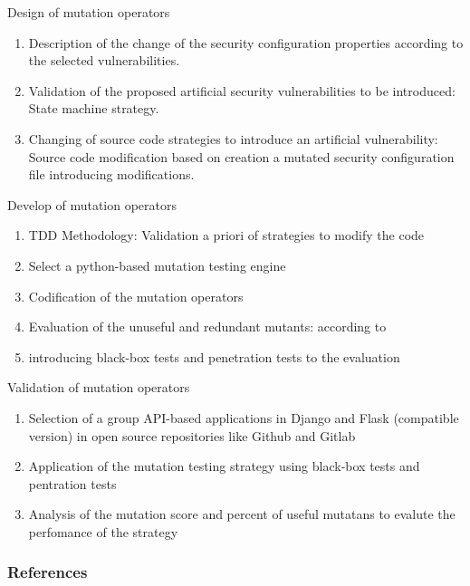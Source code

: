 \documentclass[10pt]{beamer}
\theoremstyle{remark}
\theoremstyle{definition}
\begin{document}
\begin{frame}[allowframebreaks]{Design of mutation operators}
  \begin{enumerate}
    \item Description of the change of the security configuration properties according to the selected vulnerabilities.
    \item Validation of the proposed artificial security vulnerabilities to be introduced: State machine strategy.
    \item Changing of source code strategies to introduce an artificial vulnerability: Source code modification based on creation a mutated security configuration file introducing modifications.
  \end{enumerate}
\end{frame}

\begin{frame}[allowframebreaks]{Develop of mutation operators}
  \begin{enumerate}
    \item TDD Methodology: Validation a priori of strategies to modify the code
    \item Select a python-based mutation testing engine
    \item Codification of the mutation operators
    \item Evaluation of the unuseful and redundant mutants: according to \cite{Papadakis2019}
    \item introducing black-box tests and penetration tests to the evaluation
  \end{enumerate}
\end{frame}

\begin{frame}[allowframebreaks]{Validation of mutation operators}
  \begin{enumerate}
    \item Selection of a group API-based applications in Django and Flask (compatible version) in open source repositories like Github and Gitlab
    \item Application of the mutation testing strategy using black-box tests and pentration tests
    \item Analysis of the mutation score and percent of useful mutatans to evalute the perfomance of the strategy
  \end{enumerate}
\end{frame}

\begin{frame}[allowframebreaks]
\frametitle{References}
  \printbibliography
\end{frame}
\end{document}
